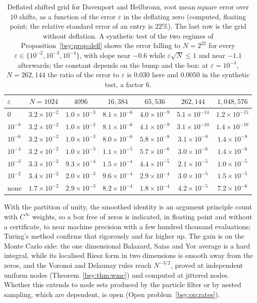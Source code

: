 \begin{table}[h]
\centering\footnotesize
\begin{tabular}{lcccccc}
\toprule
$\varepsilon$ & $N=1024$ & $4096$ & $16{,}384$ & $65{,}536$ & $262{,}144$ & $1{,}048{,}576$\\
\midrule
$0$ & $3.2\times10^{-2}$ & $1.0\times10^{-3}$ & $8.1\times10^{-6}$ & $4.0\times10^{-9}$ & $5.1\times10^{-14}$ & $1.2\times10^{-15}$\\
$10^{-8}$ & $3.2\times10^{-2}$ & $1.0\times10^{-3}$ & $8.1\times10^{-6}$ & $4.1\times10^{-9}$ & $3.1\times10^{-10}$ & $1.4\times10^{-10}$\\
$10^{-6}$ & $3.2\times10^{-2}$ & $1.0\times10^{-3}$ & $8.0\times10^{-6}$ & $5.8\times10^{-8}$ & $3.1\times10^{-8}$ & $1.4\times10^{-8}$\\
$10^{-4}$ & $3.2\times10^{-2}$ & $1.0\times10^{-3}$ & $1.1\times10^{-5}$ & $5.7\times10^{-6}$ & $3.0\times10^{-6}$ & $1.4\times10^{-6}$\\
$10^{-3}$ & $3.3\times10^{-2}$ & $9.3\times10^{-4}$ & $1.5\times10^{-4}$ & $4.4\times10^{-5}$ & $2.1\times10^{-5}$ & $1.0\times10^{-5}$\\
$10^{-2}$ & $3.4\times10^{-2}$ & $2.0\times10^{-3}$ & $9.6\times10^{-4}$ & $2.9\times10^{-4}$ & $3.0\times10^{-5}$ & $1.5\times10^{-5}$\\
none & $1.7\times10^{-2}$ & $2.9\times10^{-3}$ & $8.2\times10^{-4}$ & $1.8\times10^{-4}$ & $4.2\times10^{-5}$ & $7.2\times10^{-6}$\\
\bottomrule
\end{tabular}
\caption{Deflated shifted grid for Davenport and Heilbronn, root mean square error over $10$ shifts, as a function of the error $\varepsilon$ in the deflating zero (computed, floating point; the relative standard error of an entry is $22\%$). The last row is the grid without deflation. A synthetic test of the two regimes of Proposition~\ref{bsy:prop:defl} shows the error falling to $N=2^{22}$ for every $\varepsilon\in\{10^{-2},10^{-3},10^{-4}\}$, with slope near $-0.6$ while $\varepsilon\sqrt N\le1$ and near $-1.1$ afterwards; the constant depends on the bump and the box: at $\varepsilon=10^{-4}$, $N=262{,}144$ the ratio of the error to $\varepsilon$ is $0.030$ here and $0.0050$ in the synthetic test, a factor $6$.}\label{bsy:tab:defl}
\end{table}

With the partition of unity, the smoothed identity is an argument principle count with $C^\infty$ weights, so a box free of zeros is indicated, in floating point and without a certificate, to near machine precision with a few hundred thousand evaluations; Turing's method confirms that rigorously and far higher up. The gain is on the Monte Carlo side: the one dimensional Balazard, Saias and Yor average is a hard integral, while its localised Riesz form in two dimensions is smooth away from the zeros, and the Voronoi and Delaunay rules reach $N^{-3/2}$, proved at independent uniform nodes (Theorem~\ref{bsy:thm:wmc}) and computed at jittered nodes. Whether this extends to node sets produced by the particle filter or by nested sampling, which are dependent, is open (Open problem~\ref{bsy:op:rates}).


